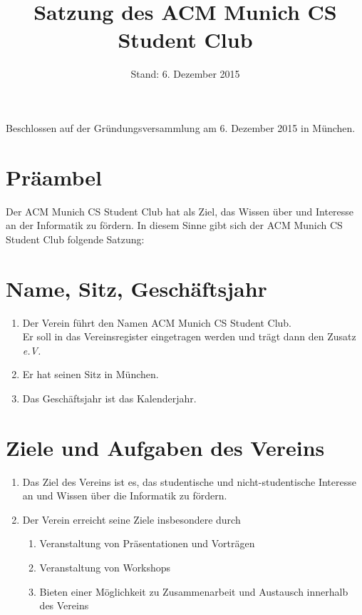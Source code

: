\documentclass{article}
\title{Satzung des ACM Munich CS Student Club}
\date{Stand: 6. Dezember 2015}
\begin{document}
\newcommand{\zit}[2]{"#1"\footnote{#2}}
\newcommand{\einf}[2]{\center{"#1"}.\arabic{subsection}}
\maketitle

\begin{center}
Beschlossen auf der Gründungsversammlung am 6. Dezember 2015 in München.
\end{center}



\section*{Präambel}
\label{sec:praeambel}
Der ACM Munich CS Student Club hat als Ziel, das Wissen über und Interesse an der Informatik zu fördern.
In diesem Sinne gibt sich der ACM Munich CS Student Club folgende Satzung:

\section{Name, Sitz, Geschäftsjahr}
\label{sec:namesitz}
\begin{enumerate}
\item Der Verein führt den Namen ACM Munich CS Student Club.\\
Er soll in das Vereinsregister eingetragen werden und trägt dann den Zusatz \textit{e.V.}

\item Er hat seinen Sitz in München.

\item Das Geschäftsjahr ist das Kalenderjahr.
\end{enumerate}

\section{Ziele und Aufgaben des Vereins}
\label{sec:ziele}
\begin{enumerate}
\item Das Ziel des Vereins ist es, das studentische und nicht-studentische Interesse an und Wissen über die Informatik zu fördern.
\item Der Verein erreicht seine Ziele insbesondere durch
\begin{enumerate}
\item Veranstaltung von Präsentationen und Vorträgen
\item Veranstaltung von Workshops
\item Bieten einer Möglichkeit zu Zusammenarbeit und Austausch innerhalb des Vereins
\end{enumerate}
  
\end{enumerate}
  
\end{document}
